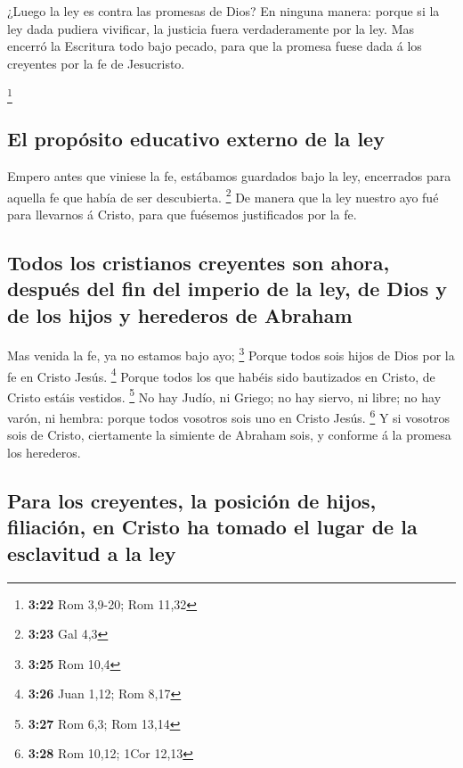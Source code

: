  ¿Luego la ley es contra las promesas de Dios? En ninguna
manera: porque si la ley dada pudiera vivificar, la justicia fuera
verdaderamente por la ley.  Mas encerró la Escritura todo
bajo pecado, para que la promesa fuese dada á los creyentes por la fe de
Jesucristo.

\footnote{\textbf{3:22} Rom 3,9-20; Rom 11,32}

\hypertarget{el-propuxf3sito-educativo-externo-de-la-ley}{%
\subsection{El propósito educativo externo de la
ley}\label{el-propuxf3sito-educativo-externo-de-la-ley}}

 Empero antes que viniese la fe, estábamos guardados bajo
la ley, encerrados para aquella fe que había de ser descubierta.
\footnote{\textbf{3:23} Gal 4,3}  De manera que la ley
nuestro ayo fué para llevarnos á Cristo, para que fuésemos justificados
por la fe.

\hypertarget{todos-los-cristianos-creyentes-son-ahora-despuuxe9s-del-fin-del-imperio-de-la-ley-de-dios-y-de-los-hijos-y-herederos-de-abraham}{%
\subsection{Todos los cristianos creyentes son ahora, después del fin
del imperio de la ley, de Dios y de los hijos y herederos de
Abraham}\label{todos-los-cristianos-creyentes-son-ahora-despuuxe9s-del-fin-del-imperio-de-la-ley-de-dios-y-de-los-hijos-y-herederos-de-abraham}}

 Mas venida la fe, ya no estamos bajo ayo; \footnote{\textbf{3:25}
  Rom 10,4}  Porque todos sois hijos de Dios por la fe en
Cristo Jesús. \footnote{\textbf{3:26} Juan 1,12; Rom 8,17} 
Porque todos los que habéis sido bautizados en Cristo, de Cristo estáis
vestidos. \footnote{\textbf{3:27} Rom 6,3; Rom 13,14}  No
hay Judío, ni Griego; no hay siervo, ni libre; no hay varón, ni hembra:
porque todos vosotros sois uno en Cristo Jesús. \footnote{\textbf{3:28}
  Rom 10,12; 1Cor 12,13}  Y si vosotros sois de Cristo,
ciertamente la simiente de Abraham sois, y conforme á la promesa los
herederos.

\hypertarget{para-los-creyentes-la-posiciuxf3n-de-hijos-filiaciuxf3n-en-cristo-ha-tomado-el-lugar-de-la-esclavitud-a-la-ley}{%
\subsection{Para los creyentes, la posición de hijos, filiación, en
Cristo ha tomado el lugar de la esclavitud a la
ley}\label{para-los-creyentes-la-posiciuxf3n-de-hijos-filiaciuxf3n-en-cristo-ha-tomado-el-lugar-de-la-esclavitud-a-la-ley}}

